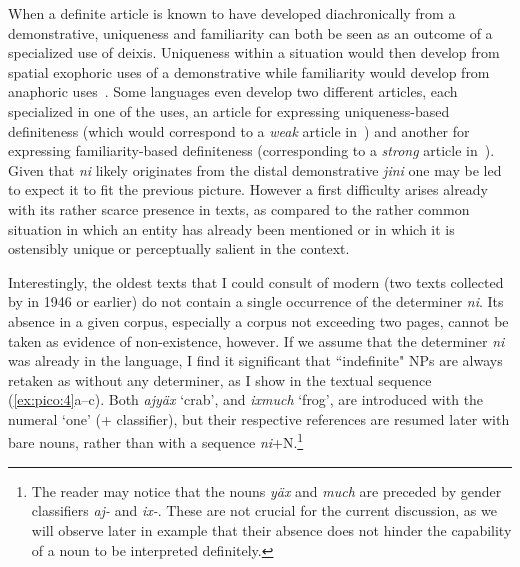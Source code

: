 \documentclass[output=paper
,modfonts
,nonflat]{langsci/langscibook}
\begin{document}
When a definite article is known to have developed diachronically from a demonstrative, uniqueness and familiarity can both be seen as an outcome of a specialized use of deixis. Uniqueness within a situation would then develop from spatial exophoric uses of a demonstrative while familiarity would develop from anaphoric uses~\citep[there is some discussion about whether one use is more fundamental, see][160]{Lyons1999}.
Some languages even develop two different articles, each specialized in one of the uses, an article for expressing uniqueness-based definiteness (which would correspond to a \textit{weak} article in~\citealt{Schwarz2013}) and another for expressing familiarity-based definiteness (corresponding to a \textit{strong} article in~\citealt{Schwarz2013}). Given that \textit{ni} likely originates from the distal demonstrative \textit{jini} one may be led to expect it to fit the previous picture. However a first difficulty arises already with its rather scarce presence in texts, as compared to the rather common situation in which an entity has already been mentioned or in which it is ostensibly unique or perceptually salient in the context.

Interestingly, the oldest texts that I could consult of modern  (two texts collected by \citeauthor{KellerHarris1946} in 1946 or earlier) do not contain a single occurrence of the determiner \textit{ni}. Its absence in a given corpus, especially a corpus not exceeding two pages, cannot be taken as evidence of non-existence, however. If we assume that the determiner \textit{ni} was already in the language, I find it significant that ``indefinite" NPs are always retaken as  without any determiner, as I show in the textual sequence (\ref{ex:pico:4}a--c). Both \textit{ajy\"ax} `crab', and \textit{ixmuch} `frog', are introduced with the numeral `one' (+ classifier), but their respective references are resumed later with bare nouns, rather than with a sequence \textit{ni}+N.\footnote{The reader may notice that the nouns \textit{y\"ax} and \textit{much} are preceded by gender classifiers \textit{aj-} and \textit{ix-}. These are not crucial for the current discussion, as we will observe later in example  that their absence does not hinder the capability of a noun to be interpreted definitely.}
\end{document}
